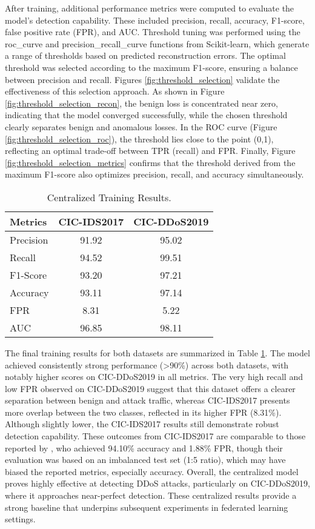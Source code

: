 After training, additional performance metrics were computed to evaluate the model’s detection capability. These included precision, recall, accuracy, F1-score, false positive rate (FPR), and AUC. Threshold tuning was performed using the roc\_curve \citep{sklearnrc} and precision\_recall\_curve \citep{sklearnprc} functions from Scikit-learn, which generate a range of thresholds based on predicted reconstruction errors. The optimal threshold was selected according to the maximum F1-score, ensuring a balance between precision and recall. Figures \ref{fig:threshold_selection} validate the effectiveness of this selection approach. As shown in Figure \ref{fig:threshold_selection_recon}, the benign loss is concentrated near zero, indicating that the model converged successfully, while the chosen threshold clearly separates benign and anomalous losses. In the ROC curve (Figure \ref{fig:threshold_selection_roc}), the threshold lies close to the point (0,1), reflecting an optimal trade-off between TPR (recall) and FPR. Finally, Figure \ref{fig:threshold_selection_metrics} confirms that the threshold derived from the maximum F1-score also optimizes precision, recall, and accuracy simultaneously.

\begin{table}[h]
    \caption{Centralized Training Results.}
    \centering
    \begin{tabular}{l|c|c}
        Metrics & CIC-IDS2017 & CIC-DDoS2019 \\
        \hline\hline
        Precision & 91.92 & 95.02 \\
        Recall & 94.52 & 99.51 \\
        F1-Score & 93.20 & 97.21 \\
        Accuracy & 93.11 & 97.14 \\
        FPR & 8.31 & 5.22 \\
        AUC & 96.85 & 98.11 \\
    \end{tabular}
    \label{tbl:central_train_results}
\end{table}

The final training results for both datasets are summarized in Table \ref{tbl:central_train_results}. The model achieved consistently strong performance (>90\%) across both datasets, with notably higher scores on CIC-DDoS2019 in all metrics. The very high recall and low FPR observed on CIC-DDoS2019 suggest that this dataset offers a clearer separation between benign and attack traffic, whereas CIC-IDS2017 presents more overlap between the two classes, reflected in its higher FPR (8.31\%). Although slightly lower, the CIC-IDS2017 results still demonstrate robust detection capability. These outcomes from CIC-IDS2017 are comparable to those reported by \cite{9110372}, who achieved 94.10\% accuracy and 1.88\% FPR, though their evaluation was based on an imbalanced test set (1:5 ratio), which may have biased the reported metrics, especially accuracy. Overall, the centralized model proves highly effective at detecting DDoS attacks, particularly on CIC-DDoS2019, where it approaches near-perfect detection. These centralized results provide a strong baseline that underpins subsequent experiments in federated learning settings.

